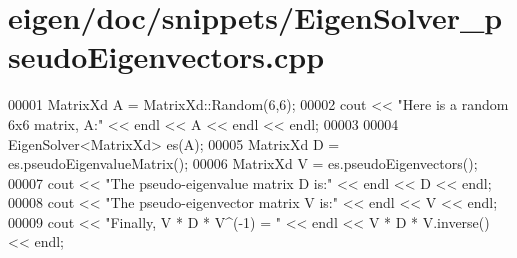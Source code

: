 \hypertarget{eigen_2doc_2snippets_2_eigen_solver__pseudo_eigenvectors_8cpp_source}{}\section{eigen/doc/snippets/\+Eigen\+Solver\+\_\+pseudo\+Eigenvectors.cpp}
\label{eigen_2doc_2snippets_2_eigen_solver__pseudo_eigenvectors_8cpp_source}

\begin{DoxyCode}
00001 MatrixXd A = MatrixXd::Random(6,6);
00002 cout << \textcolor{stringliteral}{"Here is a random 6x6 matrix, A:"} << endl << A << endl << endl;
00003 
00004 EigenSolver<MatrixXd> es(A);
00005 MatrixXd D = es.pseudoEigenvalueMatrix();
00006 MatrixXd V = es.pseudoEigenvectors();
00007 cout << \textcolor{stringliteral}{"The pseudo-eigenvalue matrix D is:"} << endl << D << endl;
00008 cout << \textcolor{stringliteral}{"The pseudo-eigenvector matrix V is:"} << endl << V << endl;
00009 cout << \textcolor{stringliteral}{"Finally, V * D * V^(-1) = "} << endl << V * D * V.inverse() << endl;
\end{DoxyCode}
